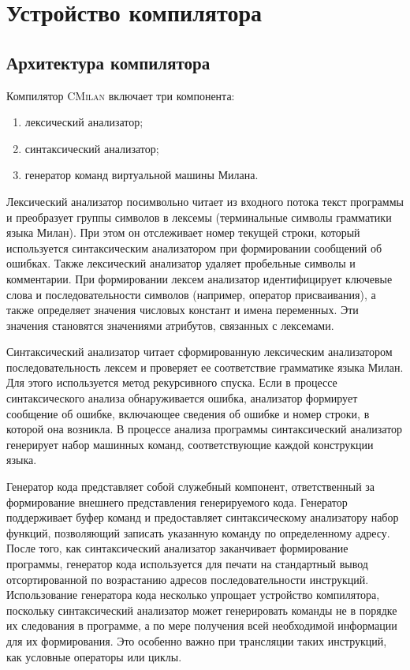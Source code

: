 \documentclass[a4paper,12pt]{article}
\begin{document}
\section{Устройство компилятора}

\subsection{Архитектура компилятора}
Компилятор \textsc{CMilan} включает три компонента:
\begin{enumerate}
\item лексический анализатор;
\item синтаксический анализатор;
\item генератор команд виртуальной машины Милана.
\end{enumerate}

Лексический анализатор посимвольно читает из входного потока текст программы и преобразует
группы символов в лексемы (терминальные символы грамматики языка Милан). При
этом он отслеживает номер текущей строки, который используется синтаксическим
анализатором при формировании сообщений об ошибках. Также лексический анализатор
удаляет пробельные символы и комментарии. При формировании лексем анализатор
идентифицирует ключевые слова и последовательности символов (например, оператор
присваивания), а также определяет значения числовых констант и имена переменных.
Эти значения становятся значениями атрибутов, связанных с лексемами.

Синтаксический анализатор читает сформированную лексическим анализатором
последовательность лексем и проверяет ее соответствие грамматике языка Милан.
Для этого используется метод рекурсивного спуска. Если в процессе
синтаксического анализа обнаруживается ошибка, анализатор формирует сообщение об
ошибке, включающее сведения об ошибке и номер строки, в которой она возникла.
В процессе анализа программы синтаксический анализатор генерирует набор машинных
команд, соответствующие каждой конструкции языка.

Генератор кода представляет собой служебный компонент, ответственный за
формирование внешнего представления генерируемого кода. Генератор поддерживает
буфер команд и предоставляет синтаксическому анализатору набор функций,
позволяющий записать указанную команду по определенному адресу. После того, как
синтаксический анализатор заканчивает формирование программы, генератор кода
используется для печати на стандартный вывод отсортированной по возрастанию
адресов последовательности инструкций. Использование генератора кода несколько
упрощает устройство компилятора, поскольку синтаксический анализатор может
генерировать команды не в порядке их следования в программе, а по мере получения
всей необходимой информации для их формирования. Это особенно важно при
трансляции таких инструкций, как условные операторы или циклы.
\end{document}
